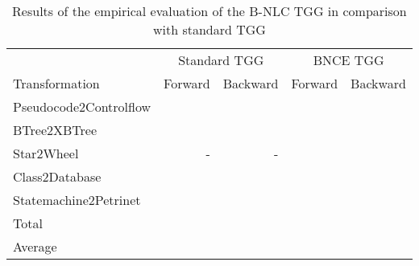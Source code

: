 
\begin{table}[h]
	\centering
	\begin{tabular}{l r r r r }
		\hline
			& \multicolumn{2}{c}{Standard TGG} & \multicolumn{2}{c}{BNCE TGG}\\
		Transformation 	& Forward & Backward & Forward & Backward \\
		\hline
		Pseudocode2Controlflow	& 		& 		& 	 	&  \\
		BTree2XBTree			&  		& 		& 		&  \\
		Star2Wheel				& -		& -		& 	 	&  \\
		Class2Database			& 		& 		&  		&   \\
		Statemachine2Petrinet	& 		& 		& 		&  \\
		\hline
		Total					&  & 		&	& \\
		Average					&  & 		&	& \\
		\hline
	\end{tabular}
	\caption{Results of the empirical evaluation of the B-NLC TGG in comparison with standard TGG}
	\label{tab:evaluation}
\end{table}